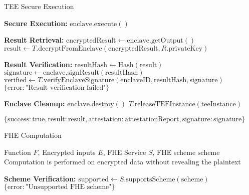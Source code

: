 \begin{tcolorbox}
\begin{tcolorbox}
\begin{protocol}{TEE Secure Execution}
\begin{algorithmic}[1]
\State \textbf{Secure Execution:}
\State $\text{enclave}.\text{execute}()$

\State \textbf{Result Retrieval:}
\State $\text{encryptedResult} \gets \text{enclave}.\text{getOutput}()$
\State $\text{result} \gets T.\text{decryptFromEnclave}(\text{encryptedResult}, R.\text{privateKey})$

\State \textbf{Result Verification:}
\State $\text{resultHash} \gets \text{Hash}(\text{result})$
\State $\text{signature} \gets \text{enclave}.\text{signResult}(\text{resultHash})$
\State $\text{verified} \gets T.\text{verifyEnclaveSignature}(\text{enclaveID}, \text{resultHash}, \text{signature})$
    \State \Return $\{\text{error}: \text{"Result verification failed"}\}$
\EndIf

\State \textbf{Enclave Cleanup:}
\State $\text{enclave}.\text{destroy}()$
\State $T.\text{releaseTEEInstance}(\text{teeInstance})$

\State \Return $\{\text{success}: \text{true}, \text{result}: \text{result}, \text{attestation}: \text{attestationReport}, \text{signature}: \text{signature}\}$
\end{algorithmic}
\end{protocol}
\end{tcolorbox}


\begin{tcolorbox}[
    enhanced,
    colback=blue!5!white,
    colframe=blue!75!black,
    arc=5mm,
    boxrule=1.5pt,
    title=Advanced Crypto Protocol,
    fonttitle=\bfseries,
    coltitle=white,
    attach boxed title to top left={yshift=-2mm, xshift=5mm},
    boxed title style={colback=blue!75!black, rounded corners},
    shadow={2mm}{-2mm}{0mm}{black!50},
    drop fuzzy shadow
]
\begin{tcolorbox}[
    enhanced,
    colback=blue!5!white,
    colframe=blue!75!black,
    arc=5mm,
    boxrule=1.5pt,
    title=Protocol,
    fonttitle=\bfseries,
    coltitle=white,
    attach boxed title to top left={yshift=-2mm, xshift=5mm},
    boxed title style={colback=blue!75!black, rounded corners},
    shadow={2mm}{-2mm}{0mm}{black!50},
    drop fuzzy shadow
]
\begin{protocol}{FHE Computation}
\label{prot:fhe-computation}
\begin{algorithmic}[1]
\Require Function $F$, Encrypted inputs $E$, FHE Service $S$, FHE scheme $\text{scheme}$
\Ensure Computation is performed on encrypted data without revealing the plaintext

\State \textbf{Scheme Verification:}
\State $\text{supported} \gets S.\text{supportsScheme}(\text{scheme})$
    \State \Return $\{\text{error}: \text{"Unsupported FHE scheme"}\}$
\EndIf


\end{algorithmic}
\end{protocol}
\end{tcolorbox}
\end{tcolorbox}
\end{tcolorbox}
